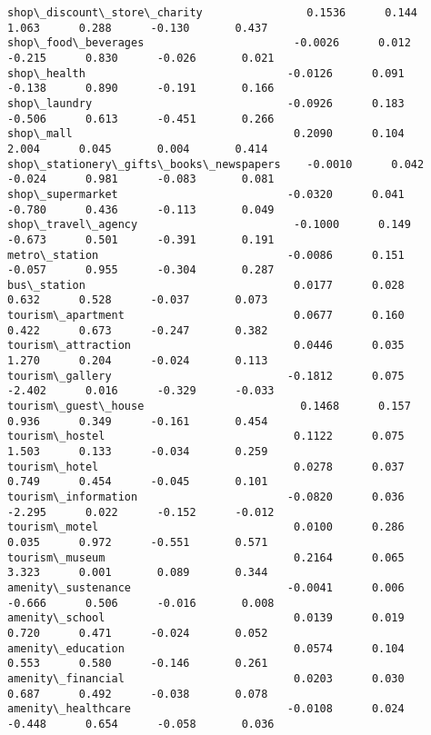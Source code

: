 \documentclass[11pt]{article}
\begin{document}
\begin{Verbatim}[commandchars=\\\{\}]
shop\_discount\_store\_charity                0.1536      0.144      1.063      0.288      -0.130       0.437
shop\_food\_beverages                       -0.0026      0.012     -0.215      0.830      -0.026       0.021
shop\_health                               -0.0126      0.091     -0.138      0.890      -0.191       0.166
shop\_laundry                              -0.0926      0.183     -0.506      0.613      -0.451       0.266
shop\_mall                                  0.2090      0.104      2.004      0.045       0.004       0.414
shop\_stationery\_gifts\_books\_newspapers    -0.0010      0.042     -0.024      0.981      -0.083       0.081
shop\_supermarket                          -0.0320      0.041     -0.780      0.436      -0.113       0.049
shop\_travel\_agency                        -0.1000      0.149     -0.673      0.501      -0.391       0.191
metro\_station                             -0.0086      0.151     -0.057      0.955      -0.304       0.287
bus\_station                                0.0177      0.028      0.632      0.528      -0.037       0.073
tourism\_apartment                          0.0677      0.160      0.422      0.673      -0.247       0.382
tourism\_attraction                         0.0446      0.035      1.270      0.204      -0.024       0.113
tourism\_gallery                           -0.1812      0.075     -2.402      0.016      -0.329      -0.033
tourism\_guest\_house                        0.1468      0.157      0.936      0.349      -0.161       0.454
tourism\_hostel                             0.1122      0.075      1.503      0.133      -0.034       0.259
tourism\_hotel                              0.0278      0.037      0.749      0.454      -0.045       0.101
tourism\_information                       -0.0820      0.036     -2.295      0.022      -0.152      -0.012
tourism\_motel                              0.0100      0.286      0.035      0.972      -0.551       0.571
tourism\_museum                             0.2164      0.065      3.323      0.001       0.089       0.344
amenity\_sustenance                        -0.0041      0.006     -0.666      0.506      -0.016       0.008
amenity\_school                             0.0139      0.019      0.720      0.471      -0.024       0.052
amenity\_education                          0.0574      0.104      0.553      0.580      -0.146       0.261
amenity\_financial                          0.0203      0.030      0.687      0.492      -0.038       0.078
amenity\_healthcare                        -0.0108      0.024     -0.448      0.654      -0.058       0.036

\end{Verbatim}
\end{document}

